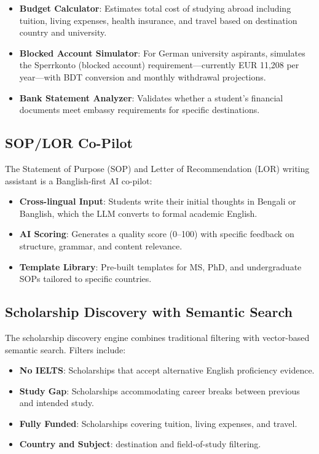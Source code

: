 \documentclass[conference]{IEEEtran}
\begin{document}
\begin{itemize}
    \item \textbf{Budget Calculator}: Estimates total cost of studying abroad including tuition, living expenses, health insurance, and travel based on destination country and university.
    \item \textbf{Blocked Account Simulator}: For German university aspirants, simulates the Sperrkonto (blocked account) requirement—currently EUR 11,208 per year—with BDT conversion and monthly withdrawal projections.
    \item \textbf{Bank Statement Analyzer}: Validates whether a student's financial documents meet embassy requirements for specific destinations.
\end{itemize}

\subsection{SOP/LOR Co-Pilot}

The Statement of Purpose (SOP) and Letter of Recommendation (LOR) writing assistant is a Banglish-first AI co-pilot:

\begin{itemize}
    \item \textbf{Cross-lingual Input}: Students write their initial thoughts in Bengali or Banglish, which the LLM converts to formal academic English.
    \item \textbf{AI Scoring}: Generates a quality score (0--100) with specific feedback on structure, grammar, and content relevance.
    \item \textbf{Template Library}: Pre-built templates for MS, PhD, and undergraduate SOPs tailored to specific countries.
\end{itemize}

\subsection{Scholarship Discovery with Semantic Search}

The scholarship discovery engine combines traditional filtering with vector-based semantic search. Filters include:

\begin{itemize}
    \item \textbf{No IELTS}: Scholarships that accept alternative English proficiency evidence.
    \item \textbf{Study Gap}: Scholarships accommodating career breaks between previous and intended study.
    \item \textbf{Fully Funded}: Scholarships covering tuition, living expenses, and travel.
    \item \textbf{Country and Subject}: destination and field-of-study filtering.
\end{itemize}
\end{document}
